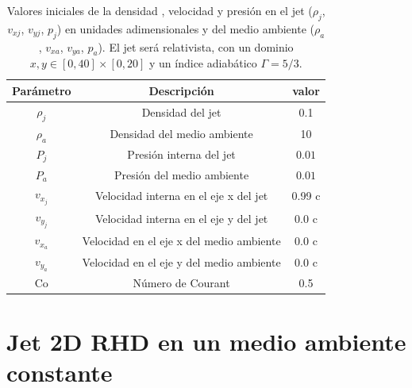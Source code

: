 \documentclass[12pt,a4paper]{book}
\begin{document}
\begin{table}[htbp]
\begin{center}
\begin{tabular}{|c|c|c|}
\hline 
\textbf{Parámetro} & \textbf{Descripción} & \textbf{valor} \\ 
\hline 
$\rho_{j}$ &  Densidad del jet & 0.1  \\ 
\hline 
$\rho_{a}$ &  Densidad del medio ambiente & 10   \\
\hline 
$P_{j}$ & Presión interna del jet& $0.01 $ \\ 
\hline 
$P_{a}$ &  Presión del medio ambiente & $0.01 $  \\ 
\hline 
$v_{x_{j}}$ & Velocidad interna en el eje x del jet & 0.99 c \\ 
\hline 
$v_{y_{j}}$ & Velocidad interna en el eje y del jet & 0.0 c \\ 
\hline 
$v_{x_{a}}$ & Velocidad en el eje x del medio ambiente & 0.0 c \\
\hline 
$v_{y_{a}}$ & Velocidad en el eje y del medio ambiente & 0.0 c \\ 
\hline 
Co & Número de Courant & 0.5 \\ 
\hline 
\end{tabular}
\caption{\label{Cuadro: propiedades-jet-comparacion} Valores iniciales de la densidad ,
velocidad  y presión  en el jet ($\rho_j$, $v_{xj}$, $v_{yj}$, $p_j$) en unidades adimensionales y 
del medio ambiente ($\rho_a$, $v_{xa}$, $v_{ya}$, $p_{a}$). El jet será relativista, con un dominio 
$x, y \in [0,40]\times[0,20]$ y un índice adiabático $\Gamma = 5/3$.}
\end{center}
\end{table}

\section{Jet 2D RHD en un medio ambiente constante}
\end{document}
